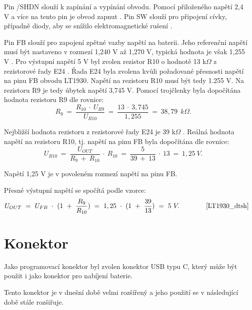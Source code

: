 Pin /SHDN slouží k zapínání a vypínání obvodu. Pomocí přiloženého napětí 2,4 V a více na tento pin je obvod zapnut \cite{LT1930_dtsh}. Pin SW slouží pro  připojení cívky, 
případně diody, aby se snížilo elektromagnetické rušení \cite{LT1930_dtsh}. 

Pin FB slouží  pro zapojení zpětné vazby napětí na baterii. Jeho referenční napětí musí být nastaveno v rozmezí 1,240 V až 1,270 V, typická hodnota je však 1,255 V \cite{LT1930_dtsh}. 
Pro výstupní napětí 5 V byl zvolen rezistor R10 o hodnotě 13 k$\Omega$ z rezistorové řady E24 \cite{rezistorova_rada}. Řada E24 byla zvolena kvůli požadované přesnosti
napětí na pinu FB obvodu LT1930. Napětí na rezistoru R10 musí být tedy 1.255 V. Na rezistoru R9 je tedy úbytek napětí 3,745 V. Pomocí trojčlenky byla dopočítána hodnota 
rezistoru R9 dle rovnice:
\begin{equation} 
  R_{9}~=~\frac{R_{10}~\cdot~U_{R9}}{U_{R10}}~=~\frac{13~\cdot~3,745}{1,255}~=~38,79~\:k\Omega. 
  \quad
\label{eq:R9}
\end{equation}

Nejbližší hodnota rezistoru z rezistorové řady E24 je 39 k$\Omega$ \cite{rezistorova_rada}. Reálná hodnota napětí na rezistoru R10, tj. napětí na pinu FB byla dopočítána
dle rovnice:
\begin{equation} 
  U_{R10}~=~\frac{U_{OUT}}{R_{9}~+~R_{10}}~\cdot~R_{10}~=~\frac{5}{39~+~13}~\cdot~13~=~1,25~V. 
  \quad
\label{eq:UR10}
\end{equation}

Napětí 1,25 V je v povoleném rozmezí napětí na pinu FB. 

Přesné výstupní napětí se spočítá podle vzorce:
\begin{equation} 
  U_{OUT}~=~U_{FB}~\cdot~(1~+~\frac{R_{9}}{R_{10}})~=~1,25~\cdot~(1~+~\frac{39}{13})~=~5~V. 
  \quad \quad \quad \quad \cite{LT1930_dtsh}
\label{eq:VOUT_LT1930}
\end{equation}





\section{Konektor}
Jako programovací konektor byl zvolen konektor USB typu C, který může být použit i jako konektor pro nabíjení baterie.

Tento konektor je v dnešní době velmi rozšířený a jeho použití se v následující době stále rozšiřuje. 

